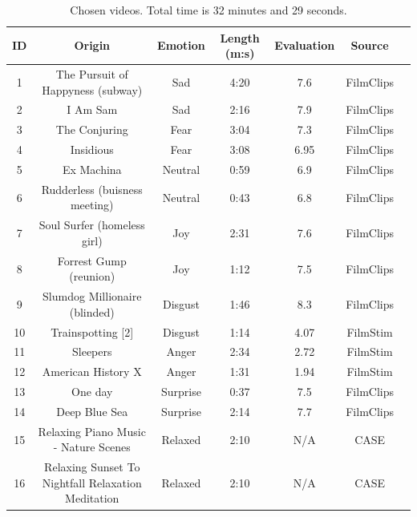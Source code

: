 \begin{table}[]
    \centering
    \begin{tabular}{|c|c|c|c|c|c|c|}
        \hline
        ID & Origin & Emotion & Length (m:s) & Evaluation & Source\\ \hline
        1 & The Pursuit of Happyness (subway) & Sad & 4:20 & 7.6  & FilmClips \cite{FilmClips} \\ \hline
        2 & I Am Sam & Sad & 2:16 & 7.9  & FilmClips \cite{FilmClips}\\ \hline
        3 & The Conjuring & Fear & 3:04 & 7.3  & FilmClips \cite{FilmClips}  \\ \hline
        4 & Insidious & Fear & 3:08 & 6.95  & FilmClips \cite{FilmClips} \\ \hline
        5 & Ex Machina & Neutral & 0:59 & 6.9  & FilmClips \cite{FilmClips} \\ \hline
        6 & Rudderless (buisness meeting) & Neutral & 0:43 & 6.8  & FilmClips \cite{FilmClips} \\ \hline
        7 & Soul Surfer (homeless girl) & Joy & 2:31 & 7.6  & FilmClips \cite{FilmClips} \\ \hline
        8 & Forrest Gump (reunion) & Joy & 1:12 & 7.5  & FilmClips \cite{FilmClips} \\ \hline
        9 & Slumdog Millionaire (blinded) & Disgust & 1:46 & 8.3  & FilmClips \cite{FilmClips} \\ \hline
        10 &  Trainspotting [2] & Disgust & 1:14 & 4.07  & FilmStim \cite{FilmStim} \\ \hline
        11 & Sleepers & Anger & 2:34 & 2.72  & FilmStim \cite{FilmStim}  \\ \hline
        12 & American History X & Anger & 1:31 & 1.94  & FilmStim \cite{FilmStim} \\ \hline
        13 & One day & Surprise & 0:37 & 7.5 & FilmClips \cite{FilmClips}\\ \hline
        14 & Deep Blue Sea & Surprise & 2:14 & 7.7 & FilmClips \cite{FilmClips} \\ \hline
        15 & Relaxing Piano Music - Nature Scenes & Relaxed & 2:10 & N/A & CASE \cite{CaseData}  \\ \hline
        16 & Relaxing Sunset To Nightfall Relaxation Meditation & Relaxed & 2:10 & N/A & CASE \cite{CaseData} \\ \hline
    \end{tabular}
    \caption{Chosen videos. Total time is 32 minutes and 29 seconds.}
    \label{tab:videos}
\end{table}

